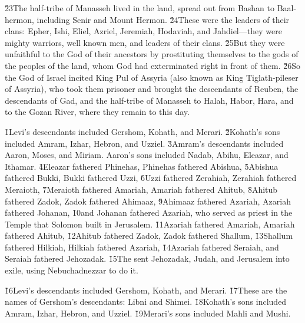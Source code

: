 \v{23}The half-tribe of Manasseh lived in the land, spread out from Bashan to Baal-hermon, including Senir and Mount Hermon. \v{24}These were the leaders of their clans: Epher, Ishi, Eliel, Azriel, Jeremiah, Hodaviah, and Jahdiel---they were mighty warriors, well known men, and leaders of their clans. \v{25}But they were unfaithful to the God of their ancestors by prostituting themselves to the gods of the peoples of the land, whom God had exterminated right in front of them. \v{26}So the God of Israel incited King Pul of Assyria (also known as King Tiglath-pileser of Assyria), who took them prisoner and brought the descendants of Reuben, the descendants of Gad, and the half-tribe of Manasseh to Halah, Habor, Hara, and to the Gozan River, where they remain to this day.

\v{1}Levi's descendants included Gershom, Kohath, and Merari. \v{2}Kohath's sons included Amram, Izhar, Hebron, and Uzziel. \v{3}Amram's descendants included Aaron, Moses, and Miriam. Aaron's sons included Nadab, Abihu, Eleazar, and Ithamar. \v{4}Eleazar fathered Phinehas, Phinehas fathered Abishua, \v{5}Abishua fathered Bukki, Bukki fathered Uzzi, \v{6}Uzzi fathered Zerahiah, Zerahiah fathered Meraioth, \v{7}Meraioth fathered Amariah, Amariah fathered Ahitub, \v{8}Ahitub fathered Zadok, Zadok fathered Ahimaaz, \v{9}Ahimaaz fathered Azariah, Azariah fathered Johanan, \v{10}and Johanan fathered Azariah, who served as priest in the Temple that Solomon built in Jerusalem. \v{11}Azariah fathered Amariah, Amariah fathered Ahitub, \v{12}Ahitub fathered Zadok, Zadok fathered Shallum, \v{13}Shallum fathered Hilkiah, Hilkiah fathered Azariah, \v{14}Azariah fathered Seraiah, and Seraiah fathered Jehozadak. \v{15}The  sent Jehozadak, Judah, and Jerusalem into exile, using Nebuchadnezzar to do it.

\v{16}Levi's descendants included Gershom, Kohath, and Merari. \v{17}These are the names of Gershom's descendants: Libni and Shimei. \v{18}Kohath's sons included Amram, Izhar, Hebron, and Uzziel. \v{19}Merari's sons included Mahli and Mushi.

